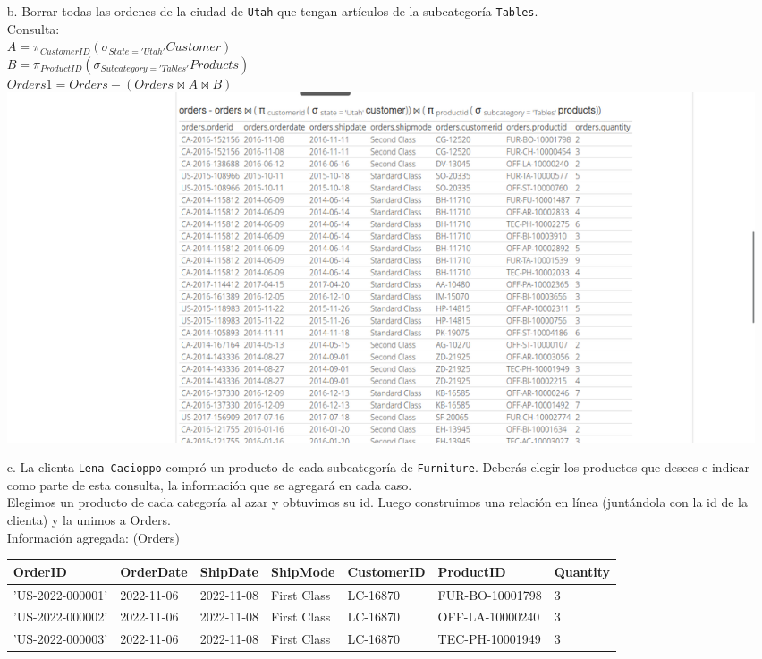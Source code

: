 \documentclass[12pt,a4paper]{article}
\begin{document}
\begin{enumerate}
\begin{enumerate}
			\item [b.] Borrar todas las ordenes de la ciudad de \texttt{Utah} que tengan artículos
				de la subcategoría \texttt{Tables}.\\
				Consulta:\\
				$A = \pi_{CustomerID} (\sigma_{State = 'Utah'} Customer)$\\
				$B = \pi_{ProductID} (\sigma_{Subcategory = 'Tables'} Products)$\\
				$Orders1 = Orders - (Orders \bowtie A \bowtie B)$\\

				\includegraphics[scale=0.4]{assets/mantenimiento_datos-b.png}

			\item [c.] La clienta \texttt{Lena Cacioppo} compró un producto de cada subcategoría de \texttt{Furniture}.
				Deberás elegir los productos que desees e indicar como parte de esta consulta,
				la información que se agregará en cada caso.\\

				Elegimos un producto de cada categoría al azar y obtuvimos su id. Luego construimos una
				relación en línea (juntándola con la id de la clienta) y la unimos a Orders.\\

				\pagebreak
				Información agregada: (Orders)\\

				\begin{table}[h!]
				\begin{tabular}{|l|l|l|l|l|l|l|}
					\hline
					OrderID				&OrderDate	&ShipDate	&ShipMode		&CustomerID	&ProductID			&Quantity\\
					\hline
					'US-2022-000001'	&2022-11-06	&2022-11-08	&First Class	&LC-16870	&FUR-BO-10001798	&3\\
					'US-2022-000002'	&2022-11-06	&2022-11-08	&First Class	&LC-16870	&OFF-LA-10000240	&3\\
					'US-2022-000003'	&2022-11-06	&2022-11-08	&First Class	&LC-16870	&TEC-PH-10001949	&3\\
					\hline
				\end{tabular}
				\end{table}


\end{enumerate}
\end{enumerate}
\end{document}
